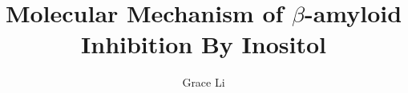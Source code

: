 \documentclass[12pt,doublespaced,normalmargins]{ut-thesis}
\author{Grace Li}
\title{Molecular Mechanism of $\beta$-amyloid Inhibition By Inositol}
\begin{document}
\begin{preliminary}

\maketitle

\cleardoublepage

% 


% 


% 

\tableofcontents
\listoftables
\listoffigures

\printnomenclature

\end{preliminary}
\end{document}
